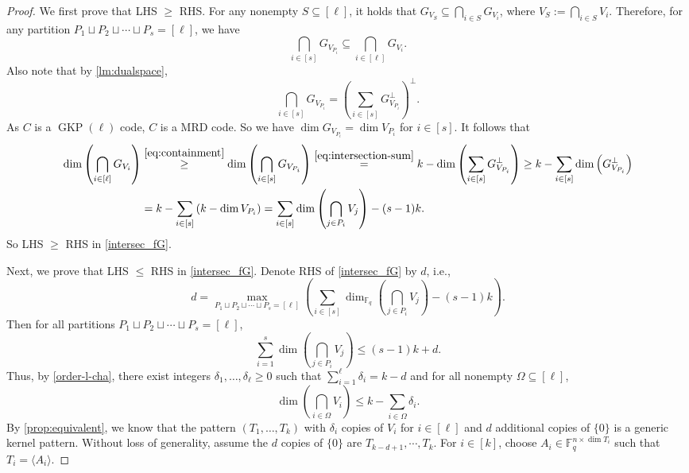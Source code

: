 \documentclass[11pt]{article}
\theoremstyle{plain}
\theoremstyle{definition}
\theoremstyle{remark}
\newcommand{\F}{\mathbb{F}}
\begin{document}
\begin{proof}
We first prove that LHS $\geq$ RHS. 
For any nonempty $S\subseteq [\ell]$, it holds that $G_{V_S}\subseteq \bigcap_{i\in S}G_{V_i}$, where $V_S:=\bigcap_{i\in S} V_i$. 
Therefore, for any partition $P_1\sqcup P_2\sqcup \cdots\sqcup P_s=[\ell]$, we have
\begin{equation}\label{eq:containment}
\bigcap_{i\in[s]}G_{V_{P_{i}}}\subseteq \bigcap_{i\in[\ell]}G_{V_{i}}.
\end{equation}
Also note that by \cref{lm:dualspace},
\begin{equation}\label{eq:intersection-sum}
\bigcap_{i\in [s]} G_{V_{P_i}}
=\left(\sum_{i\in[s]} G_{V_{P_i}}^{\perp}\right)^{\perp}.
\end{equation}
As $C$ is a $\operatorname{GKP}(\ell)$ code, $C$ is a MRD code. So we have $\dim G_{V_{P_i}}=\dim V_{P_i}$ for $i\in [s]$.
It follows that
\begin{align*}
\dim\left(\bigcap_{i\in[\ell]}G_{V_{i}}\right)
&\stackrel{\eqref{eq:containment}}{\geq}\dim\left(\bigcap_{i\in[s]}G_{V_{P_{i}}}\right)
\stackrel{\eqref{eq:intersection-sum}}{=} k-\dim\left(\sum_{i\in[s]} G_{V_{P_i}}^{\perp}\right)
\geq k-\sum_{i\in[s]}\dim\left(G_{V_{P_i}}^{\perp}\right)\\
&=k-\sum_{i\in[s]}\left(k-\dim V_{P_i}\right)
=\sum_{i\in[s]}\dim\left(\bigcap_{j\in P_i}V_j\right)-(s-1)k.
\end{align*}
So LHS $\geq$ RHS in \eqref{intersec_fG}.

Next, we prove that LHS $\leq$ RHS in \eqref{intersec_fG}. Denote RHS of \eqref{intersec_fG} by $d$, i.e.,
\[
d=\max_{P_1\sqcup P_2\sqcup \cdots\sqcup P_s=[\ell]}\left(\sum_{i\in[s]}\dim_{\F_q}\left(\bigcap_{j\in P_i}V_j\right)-(s-1)k\right).
\]
Then for all partitions $P_1\sqcup P_2\sqcup\cdots\sqcup P_s=[\ell]$,
\[
\sum_{i=1}^s\dim\left(\bigcap_{j\in P_i} V_j\right)\leq (s-1)k+d.
\]
Thus, by \cref{order-l-cha}, there exist integers $\delta_1,\ldots,\delta_\ell\geq 0$ such that $\sum_{i=1}^{\ell}\delta_i=k-d$ and for all nonempty $\Omega\subseteq [\ell]$, 
\[\dim\left(\bigcap_{i\in \Omega}V_i\right)\leq k-\sum_{i\in \Omega}\delta_i.\]
By \cref{prop:equivalent}, we know that the pattern $(T_1,\dots,T_k)$ with $\delta_i$ copies of $V_i$ for $i\in[\ell]$ and $d$ additional copies of $\{0\}$ is a generic kernel pattern. 
Without loss of generality, assume the $d$ copies of $\{0\}$ are $T_{k-d+1},\cdots,T_k$. For $i\in [k]$, choose $A_i\in\F_q^{n\times \dim T_i}$ such that $T_i=\langle A_i\rangle$.


\end{proof}
\end{document}
